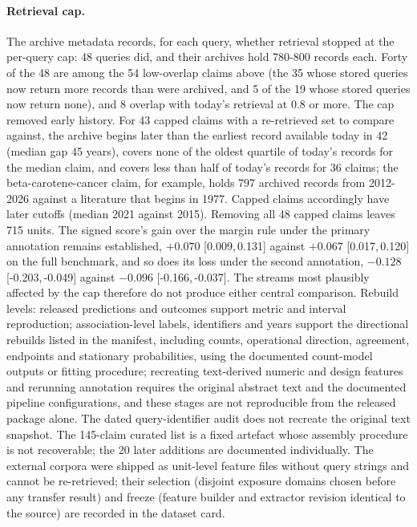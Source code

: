 \documentclass[11pt]{article}
\newcommand{\ci}[2]{[#1,\,#2]}
\begin{document}
\paragraph{Retrieval cap.} The archive metadata records, for each query, whether retrieval stopped
at the per-query cap: 48 queries did, and their archives hold 780-800 records each. Forty of the 48
are among the 54 low-overlap claims above (the 35 whose stored queries now return more records than
were archived, and 5 of the 19 whose stored queries now return none), and 8 overlap with today's
retrieval at 0.8 or more.
The cap removed early history. For 43 capped claims with a re-retrieved set to compare against, the
archive begins later than the earliest record available today in 42 (median gap 45 years), covers
none of the oldest quartile of today's records for the median claim, and covers less than half of
today's records for 36 claims; the beta-carotene-cancer claim, for example, holds 797 archived records from
2012-2026 against a literature that begins in 1977. Capped claims accordingly have later cutoffs
(median 2021 against 2015). Removing all 48 capped claims leaves 715 units. The signed score's gain over the margin rule
under the primary annotation remains established, $+0.070$ \ci{0.009}{0.131} against $+0.067$
\ci{0.017}{0.120} on the full benchmark, and so does its loss under the second annotation, $-0.128$
\ci{-0.203}{-0.049} against $-0.096$ \ci{-0.166}{-0.037}. The streams most plausibly affected by
the cap therefore do not produce either central comparison. Rebuild levels: released
predictions and outcomes support metric and interval reproduction; association-level labels,
identifiers and years support the directional rebuilds listed in the manifest, including counts,
operational direction, agreement, endpoints and stationary probabilities, using the documented
count-model outputs or fitting procedure; recreating text-derived numeric and design features and
rerunning annotation requires the original abstract text and the documented pipeline
configurations, and these stages are not reproducible from the released package alone. The dated
query-identifier audit does not recreate the original text snapshot. The 145-claim curated list is a fixed artefact whose
assembly procedure is not recoverable; the 20 later additions are documented individually. The
external corpora were shipped as unit-level feature files without query strings and cannot be
re-retrieved; their selection (disjoint exposure domains chosen before any transfer result) and
freeze (feature builder and extractor revision identical to the source) are recorded in the
dataset card.
\end{document}
